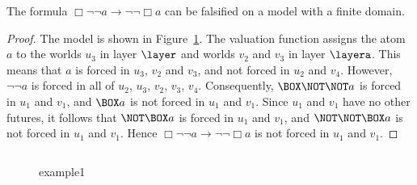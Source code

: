 \begin{proposition}
  The formula $\Box\neg\neg a \to \neg\neg \Box a$ can be falsified on
  a \kripkeplus model with a finite domain.
\end{proposition}

\begin{proof}
  The model is shown in Figure~\ref{fig:example1}. The valuation function assigns the atom $a$ to the worlds $u_3$ in layer $\layer$ and worlds $v_2$ and $v_3$ in layer $\layera$. This means that $a$ is forced in $u_3$, $v_2$ and $v_3$, and not forced in $u_2$ and $v_4$. However, $\neg\neg a$ is forced in all of $u_2$, $u_3$, $v_2$, $v_3$, $v_4$. Consequently, $\BOX\NOT\NOT a$ is forced in $u_1$ and $v_1$, and $\BOX a$ is not forced in  $u_1$ and $v_1$. Since $u_1$ and $v_1$ have no other futures, it follows that $\NOT\BOX a$ is forced in $u_1$ and $v_1$, and $\NOT\NOT\BOX a$ is not forced in $u_1$ and $v_1$. Hence $\Box\neg\neg a \to \neg\neg \Box a$ is not forced in $u_1$ and $v_1$.
\end{proof}

\begin{figure}[!t]
  $$
  
  $$
  \caption{example1}
  \label{fig:example1}
\end{figure}

